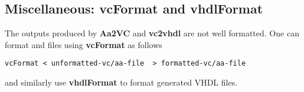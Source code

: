 \subsection{Miscellaneous: {\bf vcFormat} and {\bf vhdlFormat}}

The outputs produced by {\bf Aa2VC} and {\bf vc2vhdl} are
not well formatted.  One can format \Aa and \vC files
using  {\bf vcFormat} as follows
\begin{verbatim}
vcFormat < unformatted-vc/aa-file  > formatted-vc/aa-file
\end{verbatim}
and similarly use {\bf vhdlFormat} to format generated
VHDL files.


